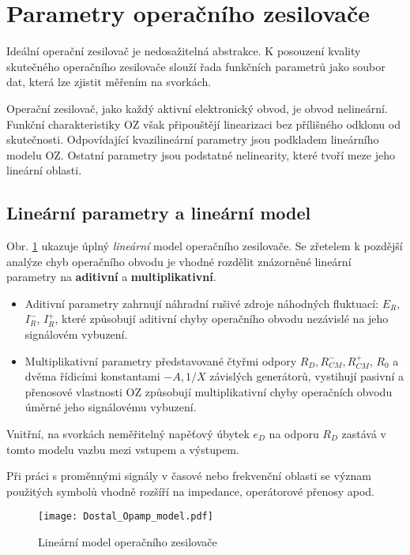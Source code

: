   \section{Parametry operačního zesilovače}
    Ideální operační zesilovač je nedosažitelná abstrakce. K posouzení kvality sku\-teč\-ného 
    operačního zesilovače slouží řada funkčních parametrů jako soubor dat, která lze zjistit 
    měřením na svorkách.
   
    Operační zesilovač, jako každý aktivní elektronický obvod, je obvod nelineární. Funkční 
    charakteristiky OZ však připouštějí linearizaci bez přílišného odklonu od skutečnosti. 
    Odpovídající kvazilineární parametry jsou podkladem lineárního modelu OZ. Ostatní parametry 
    jsou podstatné nelinearity, které tvoří meze jeho lineární oblasti.
    
    \subsection{Lineární parametry a lineární model}
      Obr. \ref{AES:fig_lin_model_opamp} ukazuje úplný \emph{lineární} model operačního zesilovače. 
      Se zřetelem k pozdější analýze chyb operačního obvodu je vhodné rozdělit znázorněné lineární 
      parametry na \textbf{aditivní} a \textbf{multiplikativní}.
      \begin{itemize}\addtolength{\itemsep}{-0.5\baselineskip}
        \item Aditivní parametry zahrnují náhradní rušivé zdroje náhodných fluktuací: $E_R$, 
              $I_R^-$, $I_R^+$, které způsobují aditivní chyby operačního obvodu nezávislé na jeho 
               signálovém vybuzení.
        \item Multiplikativní parametry představované čtyřmi odpory $R_D, R^-_{CM}, R^+_{CM}$,  
              $R_0$ a dvěma řídicími konstantami $-A, 1/X$ závislých generátorů, vystihují pasivní 
              a přenosové vlastnosti OZ způsobují multiplikativní chyby operačních obvodu úměrné 
              jeho signálovému vybuzení.
      \end{itemize}
      Vnitřní, na svorkách neměřitelný napěťový úbytek $e_D$ na odporu $R_D$ zastává v tomto modelu 
      vazbu mezi vstupem a výstupem.
     
      Při práci s proměnnými signály v časové nebo frekvenční oblasti se  význam použitých symbolů 
      vhodně rozšíří na impedance, operátorové přenosy apod.
      \begin{figure}[ht!]
        \centering
        \texttt{[image: Dostal\_Opamp\_model.pdf]}
        \caption[Lineární model operačního zesilovače]{Lineární model operačního zesilovače}
        \label{AES:fig_lin_model_opamp}
      \end{figure}
  
